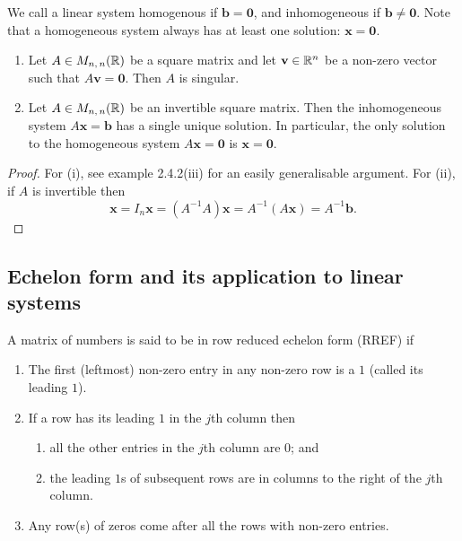 \documentclass[10pt, a4paper]{article}
\newcommand{\mbf}[1]{\mathbf{#1}}
\begin{document}
We call a linear system homogenous if $\mbf{b} = \mbf{0}$,
and inhomogeneous if $\mbf{b} \neq \mbf{0}$.
Note that a homogeneous system always has at least one solution: $\mbf{x} =\mbf{0}$.

\begin{lemma}\label{linalg_lem_invprop}\phantom{}
    \begin{enumerate}[label = (\roman*)]
        \item Let $A \in M_{n,\,n}(\mathbb{R})$ be a square matrix and let $\mbf{v} \in \R ^ n$ be a non-zero vector such that $A\mbf{v} = \mbf{0}$. Then $A$ is singular.
        \item Let $A \in M_{n,\,n}(\mathbb{R})$ be an invertible square matrix. Then the inhomogeneous system $A\mbf{x} = \mbf{b}$ has a single unique solution. In particular, the only solution to the homogeneous system $A\mbf{x} = \mbf{0}$ is $\mbf{x} = \mbf{0}$.
    \end{enumerate}
    \begin{proof}
        For (i), see example 2.4.2(iii) for an easily generalisable argument. For (ii), if $A$ is invertible then
        \[
        \mbf{x} = I_n\mbf{x} = (A ^ {-1} A)\mbf{x} = A ^ {-1}(A\mbf{x}) = A ^ {-1}\mbf{b}.
        \]
    \end{proof}
\end{lemma}

\subsection{Echelon form and its application to linear systems}

\begin{definition}
    A matrix of numbers is said to be in row reduced echelon form (RREF) if
    \begin{enumerate}[label = (\roman*)]
        \item The first (leftmost) non-zero entry in any non-zero row is a $1$ (called its leading $1$).
        \item If a row has its leading $1$ in the $j$th column then
        \begin{enumerate}[label = (\alph*)]
            \item all the other entries in the $j$th column are $0$; and
            \item the leading $1$s of subsequent rows are in columns to the right of the $j$th column.
        \end{enumerate}
    \item Any row(s) of zeros come after all the rows with non-zero entries.
    \end{enumerate}
\end{definition}
\end{document}
